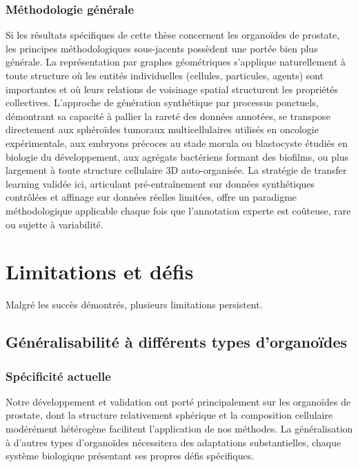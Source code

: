 \subsubsection{Méthodologie générale}

Si les résultats spécifiques de cette thèse concernent les organoïdes de prostate, les principes méthodologiques sous-jacents possèdent une portée bien plus générale. La représentation par graphes géométriques s'applique naturellement à toute structure où les entités individuelles (cellules, particules, agents) sont importantes et où leurs relations de voisinage spatial structurent les propriétés collectives. L'approche de génération synthétique par processus ponctuels, démontrant sa capacité à pallier la rareté des données annotées, se transpose directement aux sphéroïdes tumoraux multicellulaires utilisés en oncologie expérimentale, aux embryons précoces au stade morula ou blastocyste étudiés en biologie du développement, aux agrégats bactériens formant des biofilms, ou plus largement à toute structure cellulaire 3D auto-organisée. La stratégie de transfer learning validée ici, articulant pré-entraînement sur données synthétiques contrôlées et affinage sur données réelles limitées, offre un paradigme méthodologique applicable chaque fois que l'annotation experte est coûteuse, rare ou sujette à variabilité.

\section{Limitations et défis}

Malgré les succès démontrés, plusieurs limitations persistent.

\subsection{Généralisabilité à différents types d'organoïdes}

\subsubsection{Spécificité actuelle}

Notre développement et validation ont porté principalement sur les organoïdes de prostate, dont la structure relativement sphérique et la composition cellulaire modérément hétérogène facilitent l'application de nos méthodes. La généralisation à d'autres types d'organoïdes nécessitera des adaptations substantielles, chaque système biologique présentant ses propres défis spécifiques.


